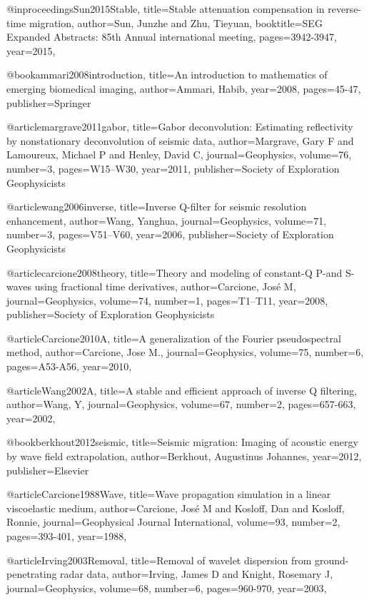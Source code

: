 @inproceedings{Sun2015Stable,
  title={Stable attenuation compensation in reverse-time migration},
  author={Sun, Junzhe and Zhu, Tieyuan},
  booktitle={SEG Expanded Abstracts: 85th Annual international meeting},
  pages={3942-3947},
  year={2015},
}

@book{ammari2008introduction,
  title={An introduction to mathematics of emerging biomedical imaging},
  author={Ammari, Habib},
  year={2008},
  pages={45-47},
  publisher={Springer}
}


@article{margrave2011gabor,
  title={Gabor deconvolution: Estimating reflectivity by nonstationary deconvolution of seismic data},
  author={Margrave, Gary F and Lamoureux, Michael P and Henley, David C},
  journal={Geophysics},
  volume={76},
  number={3},
  pages={W15--W30},
  year={2011},
  publisher={Society of Exploration Geophysicists}
}

@article{wang2006inverse,
  title={Inverse {Q}-filter for seismic resolution enhancement},
  author={Wang, Yanghua},
  journal={Geophysics},
  volume={71},
  number={3},
  pages={V51--V60},
  year={2006},
  publisher={Society of Exploration Geophysicists}
}

@article{carcione2008theory,
  title={Theory and modeling of constant-{Q} {P}-and {S}-waves using fractional time derivatives},
  author={Carcione, Jos{\'e} M},
  journal={Geophysics},
  volume={74},
  number={1},
  pages={T1--T11},
  year={2008},
  publisher={Society of Exploration Geophysicists}
}


@article{Carcione2010A,
  title={A generalization of the {F}ourier pseudospectral method},
  author={Carcione, Jose M.},
  journal={Geophysics},
  volume={75},
  number={6},
  pages={A53-A56},
  year={2010},
}

@article{Wang2002A,
  title={A stable and efficient approach of inverse {Q} filtering},
  author={Wang, Y},
  journal={Geophysics},
  volume={67},
  number={2},
  pages={657-663},
  year={2002},
}

@book{berkhout2012seismic,
  title={Seismic migration: Imaging of acoustic energy by wave field extrapolation},
  author={Berkhout, Augustinus Johannes},
  year={2012},
  publisher={Elsevier}
}

@article{Carcione1988Wave,
  title={Wave propagation simulation in a linear viscoelastic medium},
  author={Carcione, José M and Kosloff, Dan and Kosloff, Ronnie},
  journal={Geophysical Journal International},
  volume={93},
  number={2},
  pages={393-401},
  year={1988},
}

@article{Irving2003Removal,
  title={Removal of wavelet dispersion from ground-penetrating radar data},
  author={Irving, James D and Knight, Rosemary J},
  journal={Geophysics},
  volume={68},
  number={6},
  pages={960-970},
  year={2003},
}

